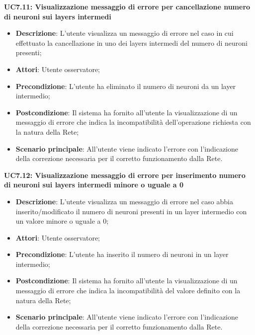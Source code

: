 \textbf{UC7.11: Visualizzazione messaggio di errore per cancellazione numero di neuroni sui layers intermedi}\mbox{}
\label{UC7.11: Visualizzazione messaggio di errore per cancellazione numero di neuroni sui layers intermedi}
\noindent
\begin{itemize}
\item \textbf{Descrizione}: L'utente visualizza un messaggio di errore nel caso in cui effettuato la cancellazione in uno dei layers intermedi del numero di neuroni presenti;
\item \textbf{Attori}: Utente osservatore;
\item \textbf{Precondizione}: L'utente ha eliminato il numero di neuroni da un layer intermedio;
\item \textbf{Postcondizione}: Il sistema ha fornito all'utente la visualizzazione di un messaggio di errore che indica la incompatibilit\`a dell'operazione richiesta con la natura della Rete;
\item \textbf{Scenario principale}: All'utente viene indicato l'errore con l'indicazione della correzione necessaria per il corretto funzionamento dalla Rete.
\end{itemize}

\textbf{UC7.12: Visualizzazione messaggio di errore per inserimento numero di neuroni sui layers intermedi minore o uguale a 0}\mbox{}
\label{UC7.12: Visualizzazione messaggio di errore per inserimento numero di neuroni sui layers intermedi minore o uguale a 0}
\noindent
\begin{itemize}
\item \textbf{Descrizione}: L'utente visualizza un messaggio di errore nel caso abbia inserito/modificato il numero di neuroni presenti in un layer intermedio con un valore minore o uguale a 0;
\item \textbf{Attori}: Utente osservatore;
\item \textbf{Precondizione}: L'utente ha inserito il numero di neuroni in un layer intermedio;
\item \textbf{Postcondizione}: Il sistema ha fornito all'utente la visualizzazione di un messaggio di errore che indica la incompatibilit\`a del valore definito con la natura della Rete;
\item \textbf{Scenario principale}: All'utente viene indicato l'errore con l'indicazione della correzione necessaria per il corretto funzionamento dalla Rete.
\end{itemize}


